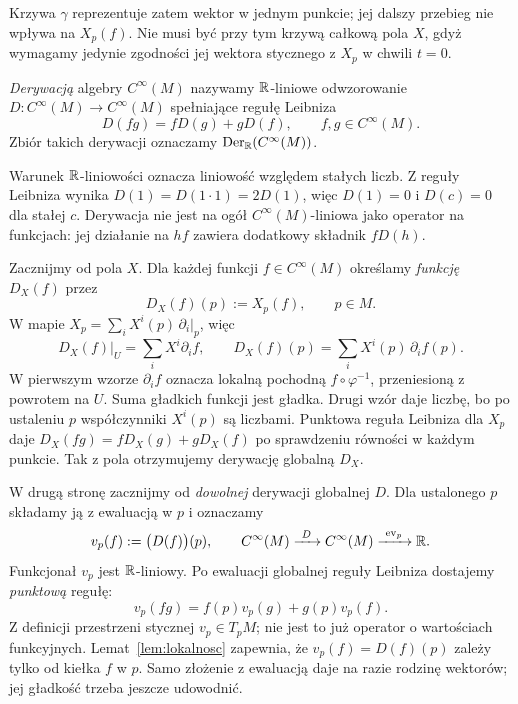 Krzywa $\gamma$ reprezentuje zatem wektor w jednym
punkcie; jej dalszy przebieg nie wpływa na $X_p(f)$.
Nie musi być przy tym krzywą całkową pola $X$,
gdyż wymagamy jedynie zgodności jej wektora stycznego
z $X_p$ w chwili $t=0$.


\begin{definicja}
\emph{Derywacją} algebry $C^\infty(M)$ nazywamy $\mathbb{R}$-liniowe odwzorowanie
$D\colon C^\infty(M)\to C^\infty(M)$ spełniające regułę Leibniza
\[
 D(fg)=fD(g)+gD(f),\qquad f,g\in C^\infty(M).
\]
Zbiór takich derywacji oznaczamy $\operatorname{Der}_{\mathbb{R}}(C^\infty(M))$.
\end{definicja}

Warunek $\mathbb{R}$-liniowości oznacza liniowość względem stałych liczb.
Z reguły Leibniza wynika $D(1)=D(1\cdot1)=2D(1)$, więc $D(1)=0$
i $D(c)=0$ dla stałej $c$. Derywacja nie jest na ogół
$C^\infty(M)$-liniowa jako operator na funkcjach: jej działanie na
$hf$ zawiera dodatkowy składnik $fD(h)$.

Zacznijmy od pola $X$. Dla każdej funkcji $f\in C^\infty(M)$ określamy
\emph{funkcję} $D_X(f)$ przez
\[
 D_X(f)(p):=X_p(f),\qquad p\in M.
\]
W mapie $X_p=\sum_iX^i(p)\,\partial_i|_p$, więc
\[
 D_X(f)\big|_U=\sum_i X^i\partial_i f,
 \qquad D_X(f)(p)=\sum_iX^i(p)\,\partial_i f(p).
\]
W pierwszym wzorze $\partial_i f$ oznacza lokalną pochodną
$f\circ\varphi^{-1}$, przeniesioną z powrotem na $U$.
Suma gładkich funkcji jest gładka. Drugi wzór daje liczbę, bo
po ustaleniu $p$ współczynniki $X^i(p)$ są liczbami.
Punktowa reguła Leibniza dla $X_p$ daje
$D_X(fg)=fD_X(g)+gD_X(f)$ po sprawdzeniu równości w każdym punkcie.
Tak z pola otrzymujemy derywację globalną $D_X$.

W drugą stronę zacznijmy od \emph{dowolnej} derywacji globalnej $D$.
Dla ustalonego $p$ składamy ją z ewaluacją w $p$ i oznaczamy
\[
 v_p(f):=\bigl(D(f)\bigr)(p),\qquad
 C^\infty(M)\xrightarrow{\ D\ }C^\infty(M)
 \xrightarrow{\ \operatorname{ev}_p\ }\mathbb{R}.
\]
Funkcjonał $v_p$ jest $\mathbb{R}$-liniowy. Po ewaluacji globalnej
reguły Leibniza dostajemy \emph{punktową} regułę:
\[
 v_p(fg)=f(p)v_p(g)+g(p)v_p(f).
\]
Z definicji przestrzeni stycznej $v_p\in T_pM$; nie jest to już
operator o wartościach funkcyjnych. Lemat~\ref{lem:lokalnosc}
zapewnia, że $v_p(f)=D(f)(p)$ zależy tylko od kiełka $f$ w $p$.
Samo złożenie z ewaluacją daje na razie rodzinę wektorów;
jej gładkość trzeba jeszcze udowodnić.

